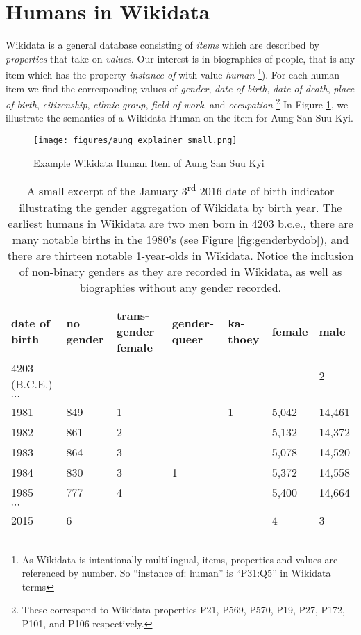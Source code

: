 \documentclass{sig-alternate-05-2015}
\begin{document}
\section{Humans in Wikidata}

Wikidata is a general database consisting of \textit{items} which are described by \textit{properties} that take on \textit{values}. Our interest is in biographies of people, that is any item which has the property \textit{instance of} with value \textit{human} \footnote{As Wikidata is intentionally multilingual, items, properties and values are referenced by number. So ``instance of: human'' is ``P31:Q5'' in Wikidata terms }). For each human item we find the corresponding values of \textit{gender}, \textit{date of birth}, \textit{date of death}, \textit{place of birth}, \textit{citizenship}, \textit{ethnic group}, \textit{field of work}, and \textit{occupation} \footnote{These correspond to Wikidata properties P21, P569, P570, P19, P27, P172, P101, and P106 respectively.} In Figure \ref{fig:aung}, we illustrate the semantics of a Wikidata Human on the item for Aung San Suu Kyi.

\begin{figure}
\texttt{[image: figures/aung\_explainer\_small.png]}
\caption{Example Wikidata Human Item of Aung San Suu Kyi}
\label{fig:aung}
\end{figure}

\begin{table}

\caption{A small excerpt of the January 3\textsuperscript{rd} 2016 date of birth indicator illustrating the gender aggregation of Wikidata by birth year. The earliest humans in Wikidata are two men born in 4203 b.c.e., there are many notable births in the 1980's (see Figure \ref{fig:genderbydob}), and there are thirteen notable 1-year-olds in Wikidata. Notice the inclusion of non-binary genders as they are recorded in Wikidata, as well as biographies without any gender recorded.}

\begin{tabular} {p{0.8cm}p{0.8cm}p{0.8cm}p{0.8cm}p{0.8cm}p{0.8cm}p{0.8cm}}

\toprule
date of birth & no gender & trans-gender female & gender-queer & ka-thoey & female & male \\
\midrule
4203 \small{(B.C.E.)} & & & & & & 2   \\
$\cdots$ &  &  &  & &  &    \\
1981 & 849 & 1 &  & 1 &5,042 & 14,461 \\
1982 & 861 & 2 &  & &5,132 & 14,372  \\
1983 & 864 & 3 &  & &5,078 & 14,520  \\
1984 & 830 & 3 & 1 & &5,372 & 14,558   \\
1985 & 777 & 4 &  & &5,400 & 14,664  \\
$\cdots$ &  &  &  & &  &    \\
2015 & 6 &  &  & & 4 & 3  \\
\bottomrule

\end{tabular}
\label{table:dob}
\end{table}
\end{document}
